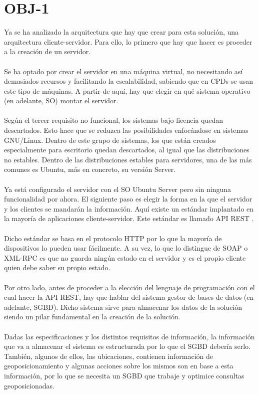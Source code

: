 \section{OBJ-1}
Ya se ha analizado la arquitectura que hay que crear para esta solución, una arquitectura cliente-servidor. Para ello, lo primero que hay que hacer es proceder a la creación de un servidor.
\\\\
Se ha optado por crear el servidor en una máquina virtual, no necesitando así demasiados recursos y facilitando la escalabilidad, sabiendo que en CPDs se usan este tipo de máquinas. A partir de aquí, hay que elegir en qué sistema operativo (en adelante, SO) montar el servidor.
\\\\
\newpage
Según el tercer requisito no funcional, los sistemas bajo licencia quedan descartados. Esto hace que se reduzca las posibilidades enfocándose en sistemas GNU/Linux. Dentro de este grupo de sistemas, los que están creados especialmente para escritorio quedan descartados, al igual que las distribuciones no estables. Dentro de las distribuciones estables para servidores, una de las más comunes \cite{linux-stats} es Ubuntu, más en concreto, su versión Server.
\\\\
Ya está configurado el servidor con el SO Ubuntu Server pero sin ninguna funcionalidad por ahora. El siguiente paso es elegir la forma en la que el servidor y los clientes se mandarán la información. Aquí existe un estándar implantado en la mayoría de aplicaciones cliente-servidor. Este estándar es llamado API REST \cite{api-rest}.
\\\\
Dicho estándar se basa en el protocolo HTTP por lo que la mayoría de dispositivos lo pueden usar fácilmente. A su vez, lo que lo distingue de SOAP o XML-RPC es que no guarda ningún estado en el servidor y es el propio cliente quien debe saber su propio estado.
\\\\
Por otro lado, antes de proceder a la elección del lenguaje de programación con el cual hacer la API REST, hay que hablar del sistema gestor de bases de datos (en adelante, SGBD). Dicho sistema sirve para almacenar los datos de la solución siendo un pilar fundamental en la creación de la solución.
\\\\
Dadas las especificaciones y los distintos requisitos de información, la información que va a almacenar el sistema es estructurada por lo que el SGBD debería serlo. También, algunos de ellos, las ubicaciones, contienen información de geoposicionamiento y algunas acciones sobre los mismos son en base a esta información, por lo que se necesita un SGBD que trabaje y optimice consultas geoposicionadas.
